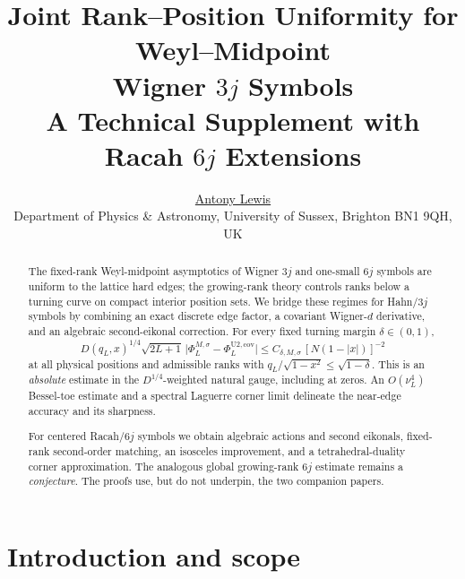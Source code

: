 \documentclass[11pt]{article}
\title{Joint Rank--Position Uniformity for Weyl--Midpoint\\
Wigner $3j$ Symbols\\[3pt]
{\large A Technical Supplement with Racah $6j$ Extensions}}
\author{\href{https://orcid.org/0000-0001-5927-6667}{Antony Lewis}\\[2pt]
{\small\normalfont Department of Physics \& Astronomy, University of Sussex, Brighton BN1 9QH, UK}}
\date{}
\theoremstyle{definition}
\theoremstyle{remark}
\renewcommand{\_}{\oldunderscore\penalty0\hskip0pt\relax}
\begin{document}
\maketitle

\begin{abstract}
The fixed-rank Weyl-midpoint asymptotics of Wigner $3j$ and one-small $6j$ symbols are uniform to the lattice hard edges;
  the growing-rank theory controls ranks below a turning curve on compact interior position sets. We bridge these regimes
  for Hahn/$3j$ symbols by combining an exact discrete edge factor, a covariant Wigner-$d$ derivative, and an algebraic
  second-eikonal correction. For every fixed turning margin $\delta\in(0,1)$,
\begin{equation}
 D(q_L,x)^{1/4}\sqrt{2L+1}\,
 \bigl|\Phi_L^{M,\sigma}-\Phi_L^{\mathrm{U2,cov}}\bigr|
 \le C_{\delta,M,\sigma}\,[N(1-|x|)]^{-2}
\end{equation}
at all physical positions and admissible ranks with $q_L/\sqrt{1-x^2}\le\sqrt{1-\delta}$. This is an \emph{absolute}
  estimate in the $D^{1/4}$-weighted natural gauge, including at zeros. An $O(\nu_L^4)$ Bessel-toe estimate and a spectral Laguerre corner limit
  delineate the near-edge accuracy and its sharpness.

For centered Racah/$6j$ symbols we obtain algebraic actions and second eikonals, fixed-rank second-order matching, an
  isosceles improvement, and a tetrahedral-duality corner approximation. The analogous global growing-rank $6j$ estimate
  remains a \emph{conjecture}. The proofs use, but do not underpin, the two companion papers.
\end{abstract}

\setcounter{tocdepth}{1}
\tableofcontents

\section{Introduction and scope}
\label{sec:intro}
\end{document}
